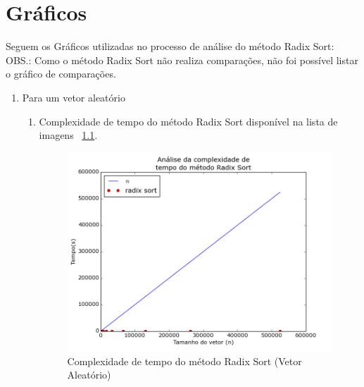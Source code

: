 \documentclass[12pt,a4paper,twoside]{report}
\begin{document}
\chapter{Gráficos}

Seguem os Gráficos utilizadas no processo de análise do método Radix Sort:
OBS.: Como o método Radix Sort não realiza comparações, não foi possível listar o gráfico de comparações.

\begin{enumerate}

	\item Para um vetor aleatório
	\begin{enumerate}
		\item Complexidade de tempo do método Radix Sort disponível na lista de imagens ~\ref{fig:RadixPlot2A}.
		\begin{figure}[!h]
			\centering
			\includegraphics[scale=0.6]{../imagens/Radix/radix_plot_2_aleatorio.png}
			\caption{Complexidade de tempo do método Radix Sort (Vetor Aleatório)\label{fig:RadixPlot2A}}
		\end{figure}



\end{enumerate}
\end{enumerate}
\end{document}
